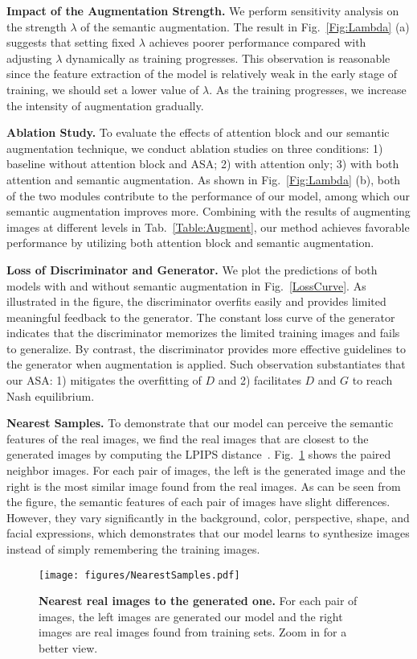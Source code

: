 \documentclass[10pt,journal,compsoc]{IEEEtran}
\begin{document}
\textbf{Impact of the Augmentation Strength.}
We perform sensitivity analysis on the strength $\lambda$ of the semantic augmentation.
The result in Fig.~\ref{Fig:Lambda} (a) suggests that setting fixed $\lambda$ achieves poorer performance compared with adjusting $\lambda$ dynamically as training progresses.
This observation is reasonable since the feature extraction of the model is relatively weak in the early stage of training, we should set a lower value of $\lambda$.
As the training progresses, we increase the intensity of augmentation gradually.

\textbf{Ablation Study.} To evaluate the effects of attention block and our semantic augmentation technique, we conduct ablation studies on three conditions: 1) baseline without attention block and ASA; 2) with attention only; 3) with both attention and semantic augmentation.
As shown in Fig.~\ref{Fig:Lambda} (b), both of the two modules contribute to the performance of our model, among which our semantic augmentation improves more.
Combining with the results of augmenting images at different levels in Tab.~\ref{Table:Augment}, our method achieves favorable performance by utilizing both attention block and semantic augmentation.

\textbf{Loss of Discriminator and Generator.} We plot the predictions of both models with and without semantic augmentation in Fig.~\ref{LossCurve}.
As illustrated in the figure, the discriminator overfits easily and provides limited meaningful feedback to the generator.
The constant loss curve of the generator indicates that the discriminator memorizes the limited training images and fails to generalize.
By contrast, the discriminator provides more effective guidelines to the generator when augmentation is applied.
Such observation substantiates that our ASA: 1) mitigates the overfitting of $D$ and 2) facilitates $D$ and $G$ to reach Nash equilibrium.

\textbf{Nearest Samples.} To demonstrate that our model can perceive the semantic features of the real images, we find the real images that are closest to the generated images by computing the LPIPS distance~\cite{zhang2018unreasonable}.
Fig.~\ref{NearestSamples} shows the paired neighbor images.
For each pair of images, the left is the generated image and the right is the most similar image found from the real images.
As can be seen from the figure, the semantic features of each pair of images have slight differences.
However, they vary significantly in the background, color, perspective, shape, and facial expressions, which demonstrates that our model learns to synthesize images instead of simply remembering the training images.
\begin{figure}
  \vspace{-2mm}
  \centering
  \texttt{[image: figures/NearestSamples.pdf]}
  \caption{\textbf{Nearest real images to the generated one.} For each pair of images, the left images are generated our model and the right images are  real images found from training sets.
  Zoom in for a better view.
  }
  \label{NearestSamples}
  \vspace{-1mm}
\end{figure}
\end{document}
